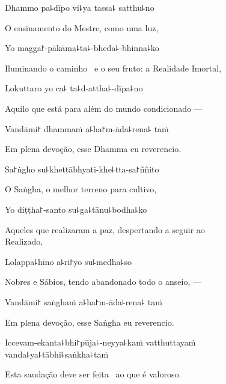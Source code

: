 Dhammo pa꜕dīpo vi꜕ya tassa꜕ satthu꜕no

\begin{english}
  O ensinamento do Mestre, como uma luz,
\end{english}

Yo magga꜓-pākāma꜕ta꜕-bheda꜕-bhinna꜕ko

\begin{english}
  Iluminando o caminho \pause\ e o seu fruto: a Realidade Imortal,
\end{english}

Lokuttaro yo ca꜕ ta꜕d-attha꜕-dīpa꜕no

\begin{english}
  Aquilo que está para além do mundo condicionado ---
\end{english}

Vandāmi꜓ dhammaṁ a꜕ha꜓m-āda꜕rena꜕ taṁ

\begin{english}
  Em plena devoção, esse Dhamma eu reverencio.
\end{english}

Sa꜓ṅgho su꜕khettābhyati-khe꜕tta-sa꜓ññito

\begin{english}
  O Saṅgha, o melhor terreno para cultivo,
\end{english}

Yo diṭṭha꜓-santo su꜕ga꜕tānu꜕bodha꜕ko

\begin{english}
  Aqueles que realizaram a paz, despertando a seguir ao\\ Realizado,
\end{english}

Lolappa꜕hīno a꜕ri꜓yo su꜕medha꜕so

\begin{english}
  Nobres e Sábios, tendo abandonado todo o anseio, ---
\end{english}

Vandāmi꜓ saṅghaṁ a꜕ha꜓m-āda꜕rena꜕ taṁ

\begin{english}
 Em plena devoção, esse Saṅgha eu reverencio.
\end{english}

Iccevam-ekanta꜕bhi꜓pūja꜕-neyya꜕kaṁ vatthuttayaṁ \\vanda꜕ya꜕tābhi꜕saṅkha꜕taṁ

\begin{english}
 Esta saudação deve ser feita \pause\ ao que é valoroso.
\end{english}

